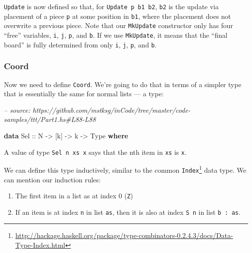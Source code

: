 \documentclass[]{article}
\newenvironment{Shaded}{}{}
\newcommand{\CommentTok}[1]{\textcolor[rgb]{0.38,0.63,0.69}{\textit{#1}}}
\newcommand{\DataTypeTok}[1]{\textcolor[rgb]{0.56,0.13,0.00}{#1}}
\newcommand{\KeywordTok}[1]{\textcolor[rgb]{0.00,0.44,0.13}{\textbf{#1}}}
\newcommand{\NormalTok}[1]{#1}
\newcommand{\OtherTok}[1]{\textcolor[rgb]{0.00,0.44,0.13}{#1}}
\renewcommand{\href}[2]{#2\footnote{\url{#1}}}
\begin{document}
\texttt{Update} is now defined so that, for \texttt{Update\ p\ b1\ b2},
\texttt{b2} is the update via placement of a piece \texttt{p} at some position
in \texttt{b1}, where the placement does not overwrite a previous piece. Note
that our \texttt{MkUpdate} constructor only has four ``free'' variables,
\texttt{i}, \texttt{j}, \texttt{p}, and \texttt{b}. If we use \texttt{MkUpdate},
it means that the ``final board'' is fully determined from only \texttt{i},
\texttt{j}, \texttt{p}, and \texttt{b}.

\hypertarget{coord}{%
\subsubsection{Coord}\label{coord}}

Now we need to define \texttt{Coord}. We're going to do that in terms of a
simpler type that is essentially the same for normal lists --- a type:

\begin{Shaded}
\begin{Highlighting}[]
\CommentTok{-- source: https://github.com/mstksg/inCode/tree/master/code-samples/ttt/Part1.hs#L88-L88}

\KeywordTok{data} \DataTypeTok{Sel}\OtherTok{ ::} \DataTypeTok{N} \OtherTok{->}\NormalTok{ [k] }\OtherTok{->}\NormalTok{ k }\OtherTok{->} \DataTypeTok{Type} \KeywordTok{where}
\end{Highlighting}
\end{Shaded}

A value of type \texttt{Sel\ n\ xs\ x} says that the nth item in \texttt{xs} is
\texttt{x}.

We can define this type inductively, similar to the common
\href{http://hackage.haskell.org/package/type-combinators-0.2.4.3/docs/Data-Type-Index.html}{\texttt{Index}}
data type. We can mention our induction rules:

\begin{enumerate}
\def\labelenumi{\arabic{enumi}.}
\tightlist
\item
  The first item in a list as at index 0 (\texttt{Z})
\item
  If an item is at index \texttt{n} in list \texttt{as}, then it is also at
  index \texttt{S\ n} in list \texttt{b\ \textquotesingle{}:\ as}.
\end{enumerate}
\end{document}
